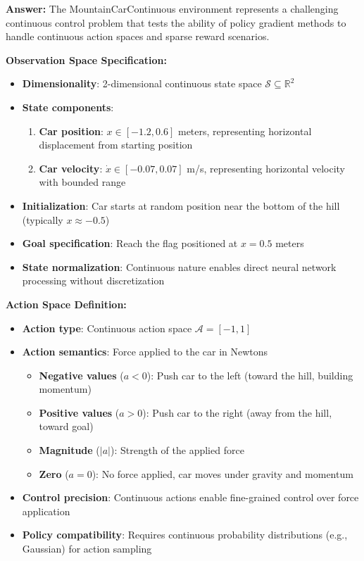 \documentclass[12pt]{article}
\begin{document}
{{{\textbf{Answer:} The MountainCarContinuous environment represents a challenging continuous control problem that tests the ability of policy gradient methods to handle continuous action spaces and sparse reward scenarios.

\textbf{Observation Space Specification:}
\begin{itemize}
    \item \textbf{Dimensionality}: 2-dimensional continuous state space $\mathcal{S} \subseteq \mathbb{R}^2$
    \item \textbf{State components}:
    \begin{enumerate}
        \item \textbf{Car position}: $x \in [-1.2, 0.6]$ meters, representing horizontal displacement from starting position
        \item \textbf{Car velocity}: $\dot{x} \in [-0.07, 0.07]$ m/s, representing horizontal velocity with bounded range
    \end{enumerate}
    \item \textbf{Initialization}: Car starts at random position near the bottom of the hill (typically $x \approx -0.5$)
    \item \textbf{Goal specification}: Reach the flag positioned at $x = 0.5$ meters
    \item \textbf{State normalization}: Continuous nature enables direct neural network processing without discretization
\end{itemize}

\textbf{Action Space Definition:}
\begin{itemize}
    \item \textbf{Action type}: Continuous action space $\mathcal{A} = [-1, 1]$
    \item \textbf{Action semantics}: Force applied to the car in Newtons
    \begin{itemize}
        \item \textbf{Negative values} ($a < 0$): Push car to the left (toward the hill, building momentum)
        \item \textbf{Positive values} ($a > 0$): Push car to the right (away from the hill, toward goal)
        \item \textbf{Magnitude} ($|a|$): Strength of the applied force
        \item \textbf{Zero} ($a = 0$): No force applied, car moves under gravity and momentum
    \end{itemize}
    \item \textbf{Control precision}: Continuous actions enable fine-grained control over force application
    \item \textbf{Policy compatibility}: Requires continuous probability distributions (e.g., Gaussian) for action sampling
\end{itemize}

}}}
\end{document}
